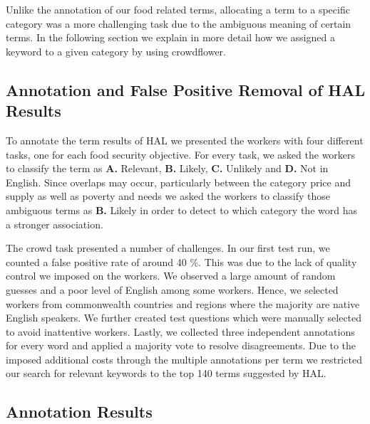Unlike the annotation of our food related terms, allocating a term to a specific category was a more challenging task due to the ambiguous meaning of certain terms. In the following section we explain in more detail how we assigned a keyword to a given category by using crowdflower. 




\subsection{Annotation and False Positive Removal of HAL Results}

To annotate the term results of HAL we presented the workers with four different tasks, one for each food security objective. For every task, we asked the workers to classify the term as \textbf{A.} Relevant, \textbf{B.} Likely, \textbf{C.} Unlikely and \textbf{D.}  Not in English. Since overlaps may occur, particularly between the category price and supply as well as poverty and needs we asked the workers to classify those ambiguous terms as \textbf{B.} Likely in order to detect to which category the word has a stronger association. 

The crowd task presented a number of challenges. In our first test run, we counted a false positive rate of around 40 \%. This was due to the lack of quality control we imposed on the workers. We observed a large amount of random guesses and a poor level of English among some workers. Hence, we selected workers from commonwealth countries and regions where the majority are native English speakers. We further created test questions which were manually selected to avoid inattentive workers. Lastly, we collected three independent annotations for every word and applied a majority vote to resolve disagreements. Due to the imposed additional costs through the multiple annotations per term we restricted our search for relevant keywords to the top 140 terms suggested by HAL.


\subsection{Annotation Results}

